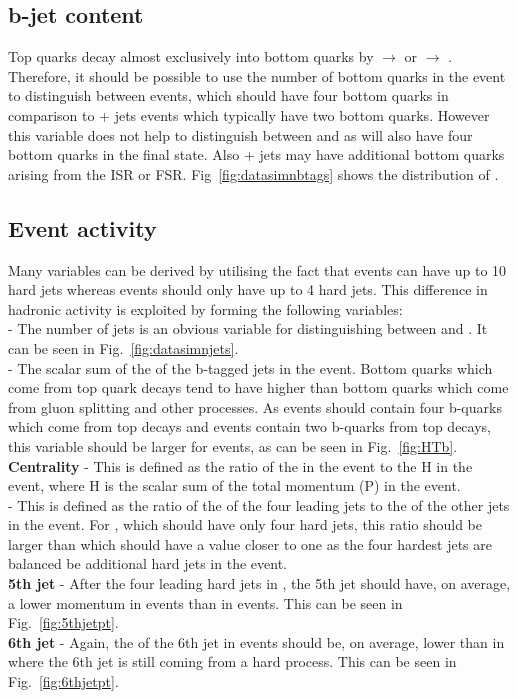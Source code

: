 \subsection{b-jet content}
\label{sec:bottomContent}
Top quarks decay almost exclusively into bottom quarks by \cPqt $\rightarrow$ \cPqb \Wplus or \cPaqt $\rightarrow$ \cPaqb \Wminus. Therefore, it should be possible to use the number of bottom quarks in the event to distinguish between \tttt events, which should have four bottom quarks in comparison to \ttbar + jets events which typically have two bottom quarks. However this variable does not help to distinguish between \tttt and \ttbb as \ttbb will also have four bottom quarks in the final state. Also \ttbar + jets may have additional bottom quarks arising from the ISR or FSR. Fig~\ref{fig:datasimnbtags} shows the distribution of \nbtags.

\subsection{Event activity}
\label{sec:eventActivity}
Many variables can be derived by utilising the fact that \tttt events can have up to 10 hard jets whereas \ttbar events should only have up to 4 hard jets. This difference in hadronic activity is exploited by forming the following variables:\\
\textbf{\njets} - The number of jets is an obvious variable for distinguishing between \tttt and \ttbar. It can be seen in Fig.~\ref{fig:datasimnjets}. \\
\textbf{\HTb} - The scalar sum of the \pt of the b-tagged jets in the event. Bottom quarks which come from top quark decays tend to have higher \pt than bottom quarks which come from gluon splitting and other processes. As \tttt events should contain four b-quarks which come from top decays and \ttbar events contain two b-quarks from top decays, this variable should be larger for \tttt events, as can be seen in Fig.~\ref{fig:HTb}.\\
\textbf{Centrality} - This is defined as the ratio of the \HT in the event to the H in the event, where H is the scalar sum of the total momentum (P) in the event.\\
\textbf{\HTrat} - This is defined as the ratio of the \HT of the four leading jets to the \HT of the other jets in the event. For \ttbar, which should have only four hard jets, this ratio should be larger than \tttt which should have a value closer to one as the four hardest jets are balanced be additional hard jets in the event. \\
\textbf{5th jet \pt} - After the four leading hard jets in \ttbar, the 5th jet should have, on average, a lower momentum in \ttbar events than in \tttt events. This can be seen in Fig.~\ref{fig:5thjetpt}.\\
\textbf{6th jet \pt} - Again, the \pt of the 6th jet in \ttbar events should be, on average, lower than in \tttt where the 6th jet is still coming from a hard process. This can be seen in Fig.~\ref{fig:6thjetpt}.\\

